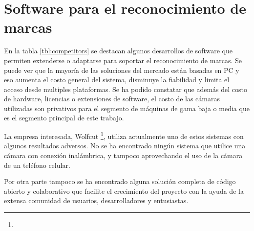 \section{Software para el reconocimiento de marcas}
   En la tabla \ref{tbl:competitors} se destacan algunos desarrollos de software que permiten extenderse o adaptarse para soportar el reconocimiento de marcas.
   Se puede ver que la mayoría de las soluciones del mercado están basadas en PC y eso aumenta el costo general del sistema, disminuye la fiabilidad y limita el acceso desde multiples plataformas.
   Se ha podido constatar que además del costo de hardware, licencias o extensiones de software, el costo de las cámaras utilizadas son privativos para el segmento de máquinas de gama baja o media que es el segmento principal de este trabajo.\par
   La empresa interesada, Wolfcut \footnote{\wolfcutlink}, utiliza actualmente uno de estos sistemas con algunos resultados adversos.
   No se ha encontrado ningún sistema que utilice una cámara con conexión inalámbrica, y tampoco aprovechando el uso de la cámara de un teléfono celular.\par
   Por otra parte tampoco se ha encontrado alguna solución completa de código abierto y colaborativo que facilite el crecimiento del proyecto con la ayuda de la extensa comunidad de usuarios, desarrolladores y entusiastas.

